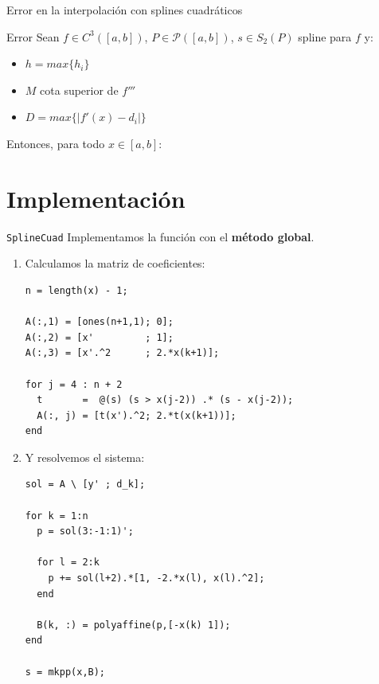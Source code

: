 \documentclass[compress]{beamer}
\theoremstyle{definition}
\begin{document}
\begin{frame}{Error en la interpolación con splines cuadráticos}
\begin{block}{Error}
Sean $f \in C^3([a,b])$, $P \in \mathscr{P}([a,b])$,
$s \in S_2(P)$ spline para $f$ y:

\begin{itemize}
\item $h = max \{h_i\}$
\item $M$ cota superior de $f'''$
\item $D = max \{|f'(x) - d_i|\}$
\end{itemize}


Entonces, para todo $x \in [a,b]$:

\end{block}
\end{frame}

\section{Implementación}

\begin{frame}[fragile]{\texttt{SplineCuad}}
Implementamos la función con el \textbf{método global}.
\begin{enumerate}[<only@+>]
\item Calculamos la matriz de coeficientes:
\begin{lstlisting}
n = length(x) - 1;

A(:,1) = [ones(n+1,1); 0];
A(:,2) = [x'         ; 1];
A(:,3) = [x'.^2      ; 2.*x(k+1)];

for j = 4 : n + 2
  t       =  @(s) (s > x(j-2)) .* (s - x(j-2));
  A(:, j) = [t(x').^2; 2.*t(x(k+1))];
end
\end{lstlisting}

\item Y resolvemos el sistema:
\begin{lstlisting}
sol = A \ [y' ; d_k];

for k = 1:n
  p = sol(3:-1:1)';

  for l = 2:k
    p += sol(l+2).*[1, -2.*x(l), x(l).^2];
  end

  B(k, :) = polyaffine(p,[-x(k) 1]);
end

s = mkpp(x,B);
\end{lstlisting}
\end{enumerate}
\end{frame}
\end{document}

